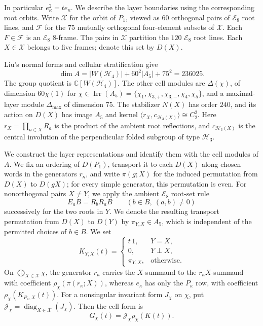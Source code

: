 \documentclass[11pt,a4paper]{amsart}
\theoremstyle{uprightdefinition}
\theoremstyle{remark}\newtheorem{remark}[theorem]{Remark}
\begin{document}
In particular $e_{\kappa}^2=t e_{\kappa}$. We describe the layer boundaries using the corresponding root orbits. Write $\mathcal X$
for the orbit of $P_1$,
viewed as $60$ orthogonal pairs of $\mathscr{E}_8$ root lines, and $\mathcal F$ for the
$75$ mutually orthogonal four-element subsets of $\mathcal X$.
Each $F\in\mathcal F$ is an $\mathscr{E}_8$ $8$-frame.  The pairs in $\mathcal X$
partition the $120$ $\mathscr{E}_8$ root lines.  Each $X\in\mathcal X$ belongs to five
frames; denote this set by $D(X)$.

Liu's normal forms and cellular stratification
\cite[Lemmas~3.1, 3.3, 3.6, Theorems~4.4 and~5.3]{Liu2016} give
\[
 \dim A=|W(\mathscr{H}_4)|+60^2|A_5|+75^2=236025.
\]
The group quotient is $\mathbb C[W(\mathscr{H}_4)]$.  The other cell modules are
$\Delta(\chi)$, of dimension $60\chi(1)$ for
$\chi\in\operatorname{Irr}(A_5)=\{\chi_1,\chi_{3,+},\chi_{3,-},\chi_4,\chi_5\}$,
and a maximal-layer module $\Delta_{\max}$ of dimension $75$.
The stabilizer $N(X)$ has order $240$, and its action on $D(X)$ has image
$A_5$ and kernel
$\langle r_X,c_{\mathscr{H}_3(X)}\rangle\cong C_2^2$.
Here $r_X=\prod_{a\in X}R_a$ is the product of the ambient root
reflections, and $c_{\mathscr{H}_3(X)}$ is the central involution of the
perpendicular folded subgroup of type $\mathscr{H}_3$.

We construct the layer representations and identify them with the cell
modules of $A$. We fix an ordering of $D(P_1)$, transport it to each $D(X)$ along
chosen words in the generators $r_{\kappa}$, and write $\pi(g;X)$ for the induced permutation
from $D(X)$ to $D(gX)$; for every simple generator, this permutation is even.
For nonorthogonal pairs $X\ne Y$, we apply the ambient $\mathscr{E}_8$ root-set rule
\[
 E_aB=R_bR_aB\qquad(b\in B,\ (a,b)\ne0)
\]
successively for the two roots in $Y$. We denote the resulting transport permutation from $D(X)$
to $D(Y)$ by $\pi_{Y,X}\in A_5$, which is independent of the
permitted choices of $b\in B$. We set
\begin{equation}\label{eq:H4-group-ring-form}
 K_{Y,X}(t)=
 \begin{cases}
 t\,1,&Y=X,\\
 0,&Y\perp X,\\
 \pi_{Y,X},&\text{otherwise}.
 \end{cases}
\end{equation}
On $\bigoplus_{X\in\mathcal X}\chi$, the generator $r_{\kappa}$ carries the
$X$-summand to the $r_{\kappa}X$-summand with coefficient
$\rho_\chi(\pi(r_{\kappa};X))$, whereas $e_{\kappa}$ has only the $P_{\kappa}$ row, with
coefficient $\rho_\chi(K_{P_{\kappa},X}(t))$.
For a nonsingular invariant form $J_\chi$ on $\chi$, put
$\mathcal J_\chi=\operatorname{diag}_{X\in\mathcal X}(J_\chi)$.
Then the cell form is
\begin{equation}\label{eq:H4-actual-pair-form}
 G_\chi(t)=\mathcal J_\chi\rho_\chi(K(t)).
\end{equation}
\end{document}
